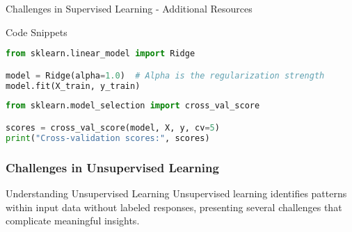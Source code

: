 \documentclass[aspectratio=169]{beamer}
\begin{document}
\begin{frame}[fragile]{Challenges in Supervised Learning - Additional Resources}
    \begin{block}{Code Snippets}
        \begin{lstlisting}[language=Python]
from sklearn.linear_model import Ridge

model = Ridge(alpha=1.0)  # Alpha is the regularization strength
model.fit(X_train, y_train)
        \end{lstlisting}
    
        \begin{lstlisting}[language=Python]
from sklearn.model_selection import cross_val_score

scores = cross_val_score(model, X, y, cv=5)
print("Cross-validation scores:", scores)
        \end{lstlisting}
    \end{block}
\end{frame}

\begin{frame}[fragile]
    \frametitle{Challenges in Unsupervised Learning}
    \begin{block}{Understanding Unsupervised Learning}
        Unsupervised learning identifies patterns within input data without labeled responses, presenting several challenges that complicate meaningful insights.
    \end{block}
\end{frame}
\end{document}

